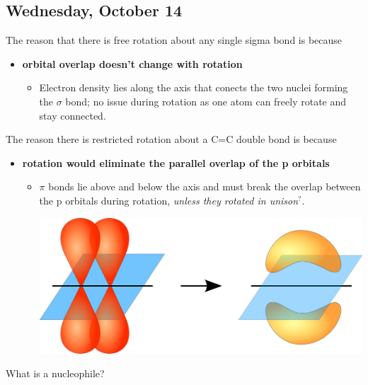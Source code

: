 \documentclass[12pt,a4paper]{article}
\begin{document}
\subsection{Wednesday, October 14}
\begin{enumerate}
    {\color{G-Moon}\item The reason that there is free rotation about any single sigma bond is because}
    \begin{itemize}
        \item {\color{o-Sun}\textbf{orbital overlap doesn't change with rotation}}
            \begin{itemize}
                \item Electron density lies along the axis that conects the two nuclei forming the $\sigma$ bond; no issue during rotation as one atom can freely rotate and stay connected.
            \end{itemize}
    \end{itemize}
    {\color{G-Moon}\item The reason there is restricted rotation about a C=C double bond is because}
        \begin{itemize}
            \item {\color{o-Sun}\textbf{rotation would eliminate the parallel overlap of the p orbitals}}
                \begin{itemize}
                    \item $\pi$ bonds lie above and below the axis and must break the overlap between the p orbitals during rotation, {\color{y-Sun}\textit{unless they rotated in unison\(^{?}\)}}. 
                \begin{center}
                    \includegraphics[scale=0.15]{images/pi-bond.pdf}
                \end{center}
                \end{itemize}
        \end{itemize}
    {\color{G-Moon}\item What is a nucleophile?}

\end{enumerate}
\end{document}
